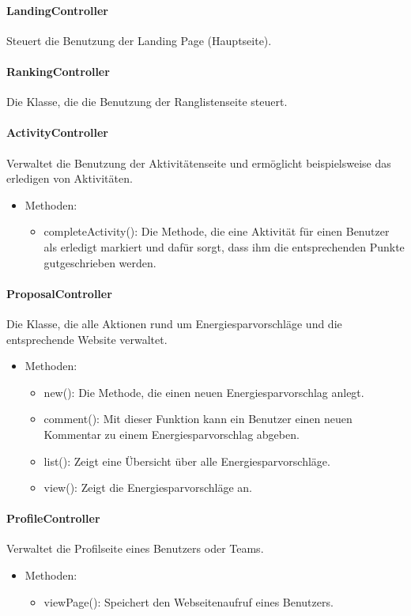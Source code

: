 	\paragraph{LandingController}Steuert die Benutzung der Landing Page (Hauptseite).
	\paragraph{RankingController}Die Klasse, die die Benutzung der Ranglistenseite steuert.
	\paragraph{ActivityController}Verwaltet die Benutzung der Aktivit\"atenseite und erm\"oglicht beispielsweise das erledigen von Aktivit\"aten.
		\begin{itemize}
			\item Methoden:
			\begin{itemize}
				\item completeActivity(): Die Methode, die eine Aktivit\"at f\"ur einen Benutzer als erledigt markiert und daf\"ur sorgt, dass ihm die entsprechenden Punkte gutgeschrieben werden.
			\end{itemize}
		\end{itemize}
	\paragraph{ProposalController}Die Klasse, die alle Aktionen rund um Energiesparvorschl\"age und die entsprechende Website verwaltet.
		\begin{itemize}
			\item Methoden:
			\begin{itemize}
				\item new(): Die Methode, die einen neuen Energiesparvorschlag anlegt.
				\item comment(): Mit dieser Funktion kann ein Benutzer einen neuen Kommentar zu einem Energiesparvorschlag abgeben.
				\item list(): Zeigt eine \"Ubersicht \"uber alle Energiesparvorschl\"age.
				\item view(): Zeigt die Energiesparvorschl\"age an.
			\end{itemize}
		\end{itemize}
	\paragraph{ProfileController}Verwaltet die Profilseite eines Benutzers oder Teams.
		\begin{itemize}
			\item Methoden:
			\begin{itemize}
				\item viewPage(): Speichert den Webseitenaufruf eines Benutzers.
			\end{itemize}
		\end{itemize}
